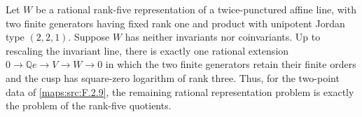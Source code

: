 \begin{proposition}\hypertarget{tag-02N0}{}\label{maps:src:F.2.11}


Let $W$ be a rational rank-five representation of a
twice-punctured affine line, with two finite generators
having fixed rank one and product with unipotent Jordan type
$(2,2,1)$.  Suppose $W$ has neither invariants nor
coinvariants.  Up to rescaling the invariant line, there is
exactly one rational extension
$0\to\mathbb Qe\to V\to W\to0$ in which the two finite
generators retain their finite orders and the cusp has
square-zero logarithm of rank three.  Thus, for the two-point data of \ref{maps:src:F.2.9}, the remaining rational
representation problem is exactly the problem of the
rank-five quotients.  

\end{proposition}



